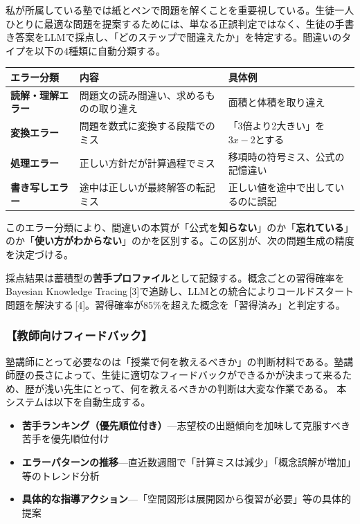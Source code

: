 \documentclass[paper=a4,fontsize=10.5bp,jafontsize=10.5bp,twocolumn]{jlreq}
\begin{document}
私が所属している塾では紙とペンで問題を解くことを重要視している。生徒一人ひとりに最適な問題を提案するためには、単なる正誤判定ではなく、生徒の手書き答案をLLMで採点し、「どのステップで間違えたか」を特定する。間違いのタイプを以下の4種類に自動分類する。


\begin{footnotesize}\noindent
\begin{tabularx}{\linewidth}{>{\bfseries}l X X}
\toprule
エラー分類 & 内容 & 具体例 \\
\midrule
読解・理解エラー & 問題文の読み間違い、求めるものの取り違え & 面積と体積を取り違え \\
変換エラー & 問題を数式に変換する段階でのミス & 「3倍より2大きい」を$3x-2$とする \\
処理エラー & 正しい方針だが計算過程でミス & 移項時の符号ミス、公式の記憶違い \\
書き写しエラー & 途中は正しいが最終解答の転記ミス & 正しい値を途中で出しているのに誤記 \\
\bottomrule
\end{tabularx}
\end{footnotesize}


このエラー分類により、間違いの本質が「公式を\textbf{知らない}」のか「\textbf{忘れている}」のか「\textbf{使い方がわからない}」のかを区別する。この区別が、次の問題生成の精度を決定づける。

採点結果は蓄積型の\textbf{苦手プロファイル}として記録する。概念ごとの習得確率をBayesian Knowledge Tracing\,[3]で追跡し、LLMとの統合によりコールドスタート問題を解決する\,[4]。習得確率が85\%を超えた概念を「習得済み」と判定する。

\subsubsection{【教師向けフィードバック】}

塾講師にとって必要なのは「授業で何を教えるべきか」の判断材料である。塾講師歴の長さによって、生徒に適切なフィードバックができるかが決まって来るため、歴が浅い先生にとって、何を教えるべきかの判断は大変な作業である。
本システムは以下を自動生成する。

\begin{itemize}
  \item \textbf{苦手ランキング（優先順位付き）}---志望校の出題傾向を加味して克服すべき苦手を優先順位付け
  \item \textbf{エラーパターンの推移}---直近数週間で「計算ミスは減少」「概念誤解が増加」等のトレンド分析
  \item \textbf{具体的な指導アクション}---「空間図形は展開図から復習が必要」等の具体的提案
\end{itemize}
\end{document}
